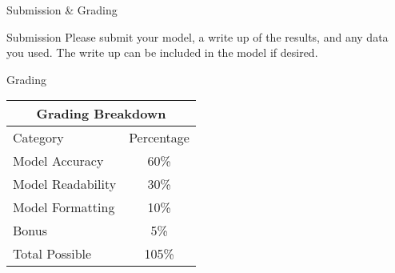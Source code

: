 \documentclass[]{article}
\begin{document}
\begin{section}{Submission \& Grading}
\begin{subsection}{Submission}
Please submit your model, a write up of the results, and any data you used. The write up can be included in the
model if desired.
\end{subsection}
\begin{subsection}{Grading}
\begin{center}
\begin{tabular}{l|c}
\multicolumn{2}{c}{Grading Breakdown}\\

\toprule
Category & Percentage\\

\cmidrule(lr){1-2}
Model Accuracy & 60\%\\
Model Readability & 30\%\\
Model Formatting & 10\%\\
Bonus & 5\%\\

\midrule
Total Possible & 105\%\\

\bottomrule
\end{tabular}
\end{center}
\end{subsection}
\end{section}
\end{document}
